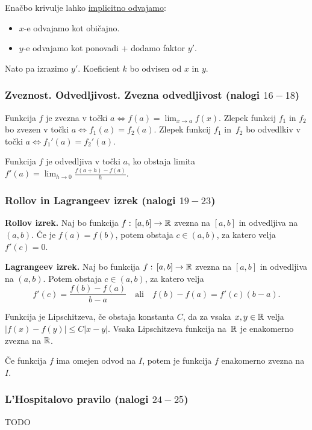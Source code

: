 Enačbo krivulje lahko \underline{implicitno odvajamo}:
\begin{itemize}
    \item $x$-e odvajamo kot običajno.
    \item $y$-e odvajamo kot ponovadi + dodamo faktor $y'$.
\end{itemize}
Nato pa izrazimo $y'$. Koeficient $k$ bo odvisen od $x$ in $y$.
%
{\color{Purple} \subsubsection*{Zveznost. Odvedljivost. Zvezna odvedljivost (nalogi $16-18$)}}
Funkcija $f$ je zvezna v točki $a \Leftrightarrow \displaystyle f(a) = \lim_{x \to a} f(x)$. Zlepek funkcij $f_1$ in $f_2$ bo zvezen v točki $a \Leftrightarrow f_1(a) = f_2(a)$. Zlepek funkcij $f_1$ in~$f_2$ bo odvedlkiv v točki $a \Leftrightarrow f_1'(a) = f_2'(a)$. 

Funkcija $f$ je odvedljiva v točki $a$, ko obstaja limita $\displaystyle f'(a) = \lim_{h \to 0} \frac{f(a+h) -f(a)}{h}$.

{\color{Purple} \subsubsection*{Rollov in Lagrangeev izrek (nalogi $19-23$)}}

\textbf{Rollov izrek.} Naj bo funkcija $f: \, [a,b] \to \mathbb{R}$ zvezna na $[a,b]$ in odvedljiva na $(a,b)$. Če je $f(a) = f(b)$, potem obstaja $c \in (a,b)$, za katero velja $f'(c) = 0$.

\textbf{Lagrangeev izrek.} Naj bo funkcija $f: \, [a,b] \to \mathbb{R}$ zvezna na $[a,b]$ in odvedljiva na $(a,b)$. Potem obstaja $c \in (a,b)$, za katero velja $$\displaystyle f'(c) = \frac{f(b) - f(a)}{b-a} \quad \text{ali} \quad f(b) - f(a) = f'(c)(b-a).$$

Funkcija je Lipschitzeva, če obstaja konstanta $C$, da za vsaka $x,y \in \mathbb{R}$ velja $|f(x)-f(y)| \leq C|x-y|$. Vsaka Lipschitzeva funkcija na~$\mathbb{R}$ je enakomerno zvezna na $\mathbb{R}$.

Če funkcija $f$ ima omejen odvod na $I$, potem je funkcija $f$ enakomerno zvezna na $I$.
%

{\color{Red} \subsubsection*{L'Hospitalovo pravilo (nalogi $24-25$)}}
TODO

